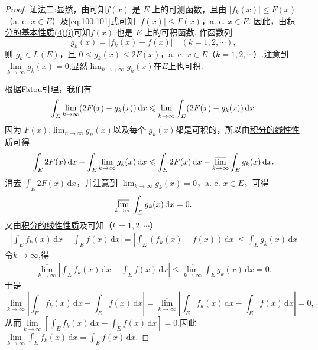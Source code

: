 \documentclass[../../main.tex]{subfiles}%
\begin{document}
\begin{proof}
{\color{blue}证法二:}显然，由可知$f(x)$ 是 $E$ 上的可测函数，且由 $|f_k(x)| \leqslant F(x)$（a. e. $x \in E$）及\eqref{eq:100.101}式可知 $|f(x)| \leqslant F(x)$，a. e. $x \in E$. 因此，由\hyperref[theorem:积分的基本性质]{积分的基本性质(4)(i)}可知$f(x)$ 也是 $E$ 上的可积函数. 作函数列
\[
g_k(x) = |f_k(x) - f(x)| \quad (k = 1, 2, \cdots),
\]
则 $g_k \in L(E)$，且 $0 \leqslant g_k(x) \leqslant 2F(x)$，a. e. $x \in E$（$k = 1, 2, \cdots$）.注意到$\underset{k\rightarrow \infty}{\lim}g_k\left( x \right) =0$,显然$\lim_{k\to +\infty}g_k(x)$在$E$上也可积.

根据\hyperref[theorem:Fatou引理]{Fatou引理}，我们有
\[
\int_E \lim_{k \to \infty} (2F(x) - g_k(x)) \, \mathrm{d}x \leqslant \varliminf_{k \to \infty} \int_E (2F(x) - g_k(x)) \, \mathrm{d}x.
\]
因为 $F(x)$,$\lim_{n\to \infty}g_n(x)$以及每个 $g_k(x)$都是可积的，所以由\hyperref[theorem:积分的线性性质]{积分的线性性质}可得
\[
\int_E 2F(x) \, \mathrm{d}x - \int_E \lim_{k \to \infty} g_k(x) \, \mathrm{d}x \leqslant \int_E 2F(x) \, \mathrm{d}x - \varlimsup_{k \to \infty} \int_E g_k(x) \, \mathrm{d}x.
\]
消去 $\int_E 2F(x) \, \mathrm{d}x$，并注意到 $\lim_{k \to \infty} g_k(x) = 0$，a. e. $x \in E$，可得
\[
\varlimsup_{k \to \infty} \int_E g_k(x) \, \mathrm{d}x = 0.
\]
又由\hyperref[theorem:积分的线性性质]{积分的线性性质}及可知（$k = 1, 2, \cdots$）
\begin{align*}
\left| \int_E f_k(x) \, \mathrm{d}x - \int_E f(x) \, \mathrm{d}x \right| = \left| \int_E (f_k(x) - f(x)) \, \mathrm{d}x \right| 
\leqslant \int_E g_k(x) \, \mathrm{d}x
\end{align*}
令$k\to \infty$,得
\begin{align*}
\underset{k\rightarrow \infty}{\overline{\lim }}\left| \int_E{f_k(x)\,\mathrm{d}x}-\int_E{f(x)\,\mathrm{d}x} \right|\leqslant \underset{k\rightarrow \infty}{\overline{\lim }}\int_E{g_k(x)\,\mathrm{d}x}=0.
\end{align*}
于是$$\underset{k\rightarrow \infty}{\lim}\left| \int_E{f_k(x)\,\mathrm{d}x}-\int_E{f(x)\,\mathrm{d}x} \right|=\underset{k\rightarrow \infty}{\overline{\lim }}\left| \int_E{f_k(x)\,\mathrm{d}x}-\int_E{f(x)\,\mathrm{d}x} \right|=0,$$
从而$\underset{k\rightarrow \infty}{\lim}\left[ \int_E{f_k(x)\,\mathrm{d}x}-\int_E{f(x)\,\mathrm{d}x} \right] =0$.因此$\underset{k\rightarrow \infty}{\lim}\int_E{f_k(x)\,\mathrm{d}x}=\int_E{f(x)\,\mathrm{d}x}.$
\end{proof}
\end{document}
